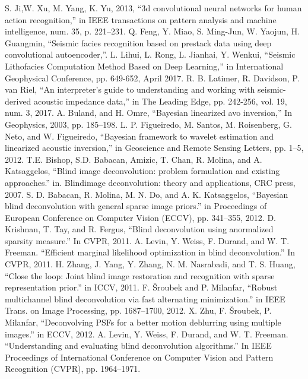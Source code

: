 \documentclass[conference]{IEEEtran}
\begin{document}
\begin{thebibliography}{00}
		S. Ji,W. Xu, M. Yang, K. Yu, 2013, ``3d convolutional neural networks for human action recognition,'' in IEEE transactions on pattern analysis and machine intelligence, num. 35, p. 221–231.
			Q. Feng, Y. Miao, S. Ming-Jun, W. Yaojun, H. Guangmin, ``Seismic facies recognition based on prestack data using deep convolutional autoencoder,''.
 			L. Lihui, L. Rong, L. Jianhai, Y. Wenkui, ``Seismic Lithofacies Computation Method Based on Deep Learning,'' in International Geophysical Conference, pp. 649-652, April 2017.
 		R. B. Latimer, R. Davidson, P. van Riel, ``An interpreter's guide to understanding and working with seismic-derived acoustic impedance data,'' in The Leading Edge, pp. 242-256, vol. 19, num. 3, 2017.
		A. Buland,  and H. Omre, ``Bayesian linearized avo inversion,'' In Geophysics, 2003, pp. 185–198.
	L. P. Figueiredo, M. Santos, M. Roisenberg, G. Neto, and W. Figueiredo, ``Bayesian framework to wavelet estimation and linearized acoustic inversion,'' in Geoscience and Remote Sensing Letters, pp. 1–5, 2012.
		T.E. Bishop, S.D. Babacan, Amizic, T. Chan, R. Molina, and A. Katsaggelos, ``Blind image deconvolution: problem formulation and existing approaches.'' in. Blindimage deconvolution: theory and applications,  CRC press, 2007.
		S. D. Babacan, R. Molina, M. N. Do, and A. K. Katsaggelos, ``Bayesian blind deconvolution with general sparse image priors.'' in Proceedings of European Conference on Computer Vision (ECCV), pp. 341–355, 2012.
		D. Krishnan, T. Tay, and R. Fergus, ``Blind deconvolution using anormalized sparsity measure.'' In CVPR, 2011.
		A. Levin, Y. Weiss, F. Durand, and W. T. Freeman. ``Efficient marginal likelihood optimization in blind deconvolution.'' In CVPR, 2011.
		H. Zhang, J. Yang, Y. Zhang, N. M. Nasrabadi, and T. S. Huang, ``Close the loop: Joint blind image restoration and recognition with sparse representation prior.'' in ICCV, 2011. 
		F. Šroubek and P. Milanfar, ``Robust multichannel blind deconvolution via fast alternating minimization.'' in IEEE Trans. on Image Processing, pp. 1687–1700, 2012.
		X. Zhu, F. Šroubek, P. Milanfar, ``Deconvolving PSFs for a better motion deblurring using multiple images.'' in ECCV, 2012.
			A. Levin, Y. Weiss, F. Durand, and W. T. Freeman. ``Understanding and evaluating blind deconvolution algorithms.'' In IEEE Proceedings of International Conference on Computer Vision and Pattern Recognition (CVPR), pp. 1964–1971.

\end{thebibliography}
\end{document}
